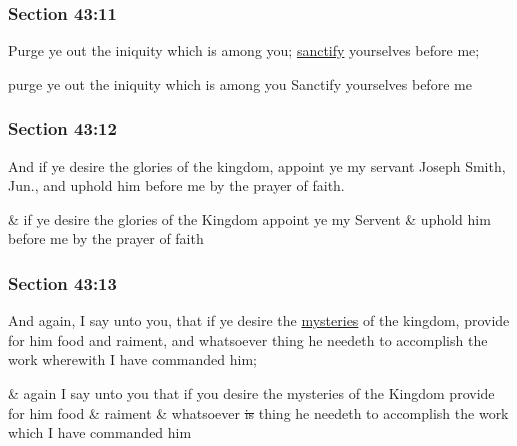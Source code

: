 	\subsubsection{Section 43:11} %
		\label{DC43-11}

		Purge ye out the iniquity which is among you; \hyperref[SANCTIFICATION]{sanctify} yourselves before me;

		\begin{framed}
		\scriptsize
			\begin{compactdesc}
				\item[JSP] purge ye out the iniquity which is among you Sanctify yourselves before me
			\end{compactdesc}
		\end{framed}

	\subsubsection{Section 43:12} %
		\label{DC43-12}

		And if ye desire the glories of the kingdom, appoint ye my servant Joseph Smith, Jun., and uphold him before me by the prayer of faith.

		\begin{framed}
		\scriptsize
			\begin{compactdesc}
				\item[JSP] \& if ye desire the glories of the Kingdom appoint ye my Servent \& uphold him before me by the prayer of faith
			\end{compactdesc}
		\end{framed}

	\subsubsection{Section 43:13} %
		\label{DC43-13}

		And again, I say unto you, that if ye desire the \hyperref[MYSTERY]{mysteries} of the kingdom, provide for him food and raiment, and whatsoever thing he needeth to accomplish the work wherewith I have commanded him;

		\begin{framed}
		\scriptsize
			\begin{compactdesc}
				\item[JSP] \& again I say unto you that if you desire the mysteries of the Kingdom provide for him food \& raiment \& whatsoever \sout{is} thing he needeth to accomplish the work which I have commanded him
			\end{compactdesc}
		\end{framed}

